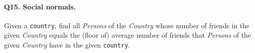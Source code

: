 \paragraph{\textbf{Q15}. Social normals.}
Given a \texttt{country}, find all \emph{Persons} of the \emph{Country}
whose number of friends in the given \emph{Country} equals the (floor
of) average number of friends that \emph{Persons} of the given
\emph{Country} have in the given \texttt{country}.
